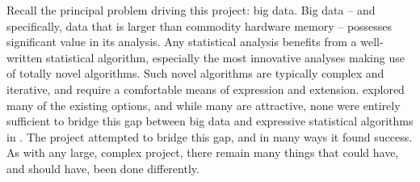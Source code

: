 Recall the principal problem driving this project: big data.
Big data -- and specifically, data that is larger than commodity hardware memory -- possesses significant value in its analysis.
Any statistical analysis benefits from a well-written statistical algorithm, especially the most innovative analyses making use of totally novel algorithms.
Such novel algorithms are typically complex and iterative, and require a comfortable means of expression and extension.
 explored many of the existing options, and while many are attractive, none were entirely sufficient to bridge this gap between big data and expressive statistical algorithms in \R{}.
The \lsr{} project attempted to bridge this gap, and in many ways it found success.
As with any large, complex project, there remain many things that could have, and should have, been done differently.

